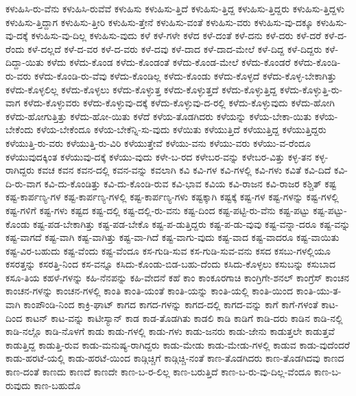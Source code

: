 {ಕಳುಹಿಸಿ-ರು-ವೆನು
ಕಳುಹಿಸಿ-ರುವೆವೆ
ಕಳುಹಿಸು
ಕಳುಹಿಸು-ತ್ತಿದೆ
ಕಳುಹಿಸು-ತ್ತಿದ್ದ
ಕಳುಹಿಸು-ತ್ತಿದ್ದರು
ಕಳುಹಿಸು-ತ್ತಿದ್ದಳು
ಕಳುಹಿಸು-ತ್ತಿದ್ದಾಗ
ಕಳುಹಿಸು-ತ್ತೀರಿ
ಕಳುಹಿಸು-ತ್ತೇನೆ
ಕಳುಹಿಸು-ವಂತೆ
ಕಳುಹಿಸು-ವರು
ಕಳುಹಿಸು-ವು-ದಕ್ಕೂ
ಕಳುಹಿಸು-ವು-ದಕ್ಕೆ
ಕಳುಹಿಸು-ವು-ದಿಲ್ಲ
ಕಳುಹಿಸು-ವುದು
ಕಳೆ
ಕಳೆ-ಗಳೇ
ಕಳೆದ
ಕಳೆ-ದಂತೆ
ಕಳೆ-ದನು
ಕಳೆ-ದರು
ಕಳೆ-ದರೆ
ಕಳೆ-ದ-ರೆಂದು
ಕಳೆ-ದಲ್ಲದೆ
ಕಳೆ-ದ-ವರ
ಕಳೆ-ದ-ವರು
ಕಳೆ-ದವು
ಕಳೆ-ದಾದ
ಕಳೆ-ದಾದ-ಮೇಲೆ
ಕಳೆ-ದಿದ್ದ
ಕಳೆ-ದಿದ್ದರು
ಕಳೆ-ದಿದ್ದಾ-ಯಿತು
ಕಳೆದು
ಕಳೆದು-ಕೊಂಡ
ಕಳೆದು-ಕೊಂಡಂತೆ
ಕಳೆದು-ಕೊಂಡ-ಮೇಲೆ
ಕಳೆದು-ಕೊಂಡರೆ
ಕಳೆದು-ಕೊಂಡಿ-ರು-ವರು
ಕಳೆದು-ಕೊಂಡಿ-ರು-ವೆವು
ಕಳೆದು-ಕೊಂಡಿಲ್ಲ
ಕಳೆದು-ಕೊಂಡು
ಕಳೆದು-ಕೊಳ್ಳದೆ
ಕಳೆದು-ಕೊಳ್ಳ-ಬೇಕಾಗಿತ್ತು
ಕಳೆದು-ಕೊಳ್ಳಲಿಲ್ಲ
ಕಳೆದು-ಕೊಳ್ಳಲು
ಕಳೆದು-ಕೊಳ್ಳುತ್ತ
ಕಳೆದು-ಕೊಳ್ಳುತ್ತದೆ
ಕಳೆದು-ಕೊಳ್ಳುತ್ತಿದ್ದ
ಕಳೆದು-ಕೊಳ್ಳುತ್ತಿ-ರು-ವಾಗ
ಕಳೆದು-ಕೊಳ್ಳುವರು
ಕಳೆದು-ಕೊಳ್ಳುವು-ದಕ್ಕೆ
ಕಳೆದು-ಕೊಳ್ಳುವು-ದ-ರಲ್ಲಿ
ಕಳೆದು-ಕೊಳ್ಳುವುದು
ಕಳೆದು-ಹೋಗಿ
ಕಳೆದು-ಹೋಗುತ್ತಿತ್ತು
ಕಳೆದು-ಹೋ-ಯಿತು
ಕಳೆದೆ
ಕಳೆಯ-ತೊಡಗಿದರು
ಕಳೆಯನ್ನು
ಕಳೆಯ-ಬೇಕಾ-ಯಿತು
ಕಳೆಯ-ಬೇಕೆಂದು
ಕಳೆಯ-ಬೇಕೆಂದೂ
ಕಳೆಯ-ಬೇಕೆನ್ನಿ-ಸು-ವುದು
ಕಳೆಯಿತು
ಕಳೆಯುತ್ತಿದೆ
ಕಳೆಯುತ್ತಿದ್ದ
ಕಳೆಯುತ್ತಿದ್ದರು
ಕಳೆಯುತ್ತಿ-ರು-ವರು
ಕಳೆಯುತ್ತಿ-ರು-ವಿರಿ
ಕಳೆಯುತ್ತೇವೆ
ಕಳೆಯು-ವನು
ಕಳೆಯು-ವರು
ಕಳೆಯು-ವ-ರೆಂದೂ
ಕಳೆಯುವುದಕ್ಕಿಂತ
ಕಳೆಯುವು-ದಕ್ಕೆ
ಕಳೆಯು-ವುದು
ಕಳೇ-ಬ-ರದ
ಕಳೇಬರ-ವನ್ನು
ಕಳೇಬರ-ವಿತ್ತು
ಕಳ್ಳ-ತನ
ಕಳ್ಳ-ರಾಗಿದ್ದರು
ಕವಚ
ಕವನ
ಕವನ-ದಲ್ಲಿ
ಕವನ-ವನ್ನು
ಕವಲಾಗಿ
ಕವಿ
ಕವಿ-ಗಳ
ಕವಿ-ಗಳಲ್ಲಿ
ಕವಿ-ಗಳು
ಕವಿತೆ
ಕವಿ-ದಿದೆ
ಕವಿ-ದಿ-ರು-ವಾಗ
ಕವಿ-ದು-ಕೊಂಡಿತ್ತು
ಕವಿ-ದು-ಕೊಂಡಿ-ರುವ
ಕವಿ-ಭಾವ
ಕವಿಯ
ಕವಿ-ರಾಜನ
ಕವಿ-ರಾಜರ
ಕಶ್ಚಿತ್
ಕಷ್ಟ
ಕಷ್ಟ-ಕಾರ್ಪಣ್ಯ-ಗಳ
ಕಷ್ಟ-ಕಾರ್ಪಣ್ಯ-ಗಳಲ್ಲಿ
ಕಷ್ಟ-ಕಾರ್ಪಣ್ಯ-ಗಳು
ಕಷ್ಟಕ್ಕಾಗಿ
ಕಷ್ಟಕ್ಕೆ
ಕಷ್ಟ-ಗಳ
ಕಷ್ಟ-ಗಳನ್ನು
ಕಷ್ಟ-ಗಳಲ್ಲಿ
ಕಷ್ಟ-ಗಳಿಗೆ
ಕಷ್ಟ-ಗಳು
ಕಷ್ಟದ
ಕಷ್ಟ-ದಲ್ಲಿ
ಕಷ್ಟ-ದಲ್ಲಿ-ರು-ವನು
ಕಷ್ಟ-ದಿಂದ
ಕಷ್ಟ-ಪಟ್ಟಿ-ರು-ವೆನು
ಕಷ್ಟ-ಪಟ್ಟು
ಕಷ್ಟ-ಪಟ್ಟು-ಕೊಂಡು
ಕಷ್ಟ-ಪಡ-ಬೇಕಾಗಿತ್ತು
ಕಷ್ಟ-ಪಡ-ಬೇಕೊ
ಕಷ್ಟ-ಪ-ಡುತ್ತಿದ್ದರು
ಕಷ್ಟ-ಪ-ಡು-ವುವು
ಕಷ್ಟ-ವನ್ನಾ-ದರೂ
ಕಷ್ಟ-ವನ್ನು
ಕಷ್ಟ-ವಾಗದೆ
ಕಷ್ಟ-ವಾಗಿ
ಕಷ್ಟ-ವಾಗಿತ್ತು
ಕಷ್ಟ-ವಾ-ಗಿದೆ
ಕಷ್ಟ-ವಾಗು-ವುದು
ಕಷ್ಟ-ವಾದ
ಕಷ್ಟ-ವಾದರೂ
ಕಷ್ಟ-ವಾಯಿತು
ಕಷ್ಟ-ವಿರ-ಬಹುದು
ಕಷ್ಟ-ವೆಂದು
ಕಷ್ಟ-ವೆಂದೂ
ಕಸ-ಗುಡಿ-ಸುವ
ಕಸ-ಗುಡಿ-ಸುವ-ವನು
ಕಸದ
ಕಸಬು-ಗಳಲ್ಲಿಯೂ
ಕಸರತ್ತನ್ನು
ಕಸರತ್ತಿ-ನಿಂದ
ಕಸ-ವನ್ನೂ
ಕಸಿದು-ಕೊಂಡು-ಬಿಡ-ಬಹು-ದೆಂದು
ಕಸಿದು-ಕೊಳ್ಳಲು
ಕಸುಬನ್ನು
ಕಸುಬಾದ
ಕಸೂ-ತಿಯ
ಕಹಳೆ-ಗಳನ್ನು
ಕಹಿ-ನೆನಪನ್ನು
ಕಹಿ-ವೇದನೆ
ಕಹೆ
ಕಾಂ
ಕಾಂಕೂರಗಾಚಿ
ಕಾಂಗ್ರಿಗೇ-ಶನಲ್
ಕಾಂಗ್ರೆಸ್
ಕಾಂಚನ
ಕಾಂಚನ-ಗಳನ್ನು
ಕಾಂಚನ-ಗಳಲ್ಲಿ
ಕಾಂತಿ
ಕಾಂತಿ-ಯಂತೆ
ಕಾಂತಿ-ಯನ್ನು
ಕಾಂತಿ-ಯಲ್ಲಿ
ಕಾಂತಿ-ಯಿಂದ
ಕಾಂತಿ-ಯು-ತ-ವಾಗಿ
ಕಾಂಪೌಂಡಿ-ನಿಂದ
ಕಾಕ್ರಿ-ಘಾಟ್
ಕಾಗದ
ಕಾಗದ-ಗಳನ್ನು
ಕಾಗದ-ದಲ್ಲಿ
ಕಾಗದ-ವನ್ನು
ಕಾಗೆ
ಕಾಗೆ-ಗಳಂತೆ
ಕಾಟ-ದಿಂದ
ಕಾಟನ್
ಕಾಟ-ವನ್ನು
ಕಾಟೀಸ್ಯಾನ್
ಕಾಡ
ಕಾಡ-ತೊಡಗಿತು
ಕಾಡಲಿ
ಕಾಡಿ
ಕಾಡಿಗೆ
ಕಾಡಿ-ದರು
ಕಾಡಿನ
ಕಾಡಿ-ನಲ್ಲಿ
ಕಾಡಿ-ನಲ್ಲೊ
ಕಾಡಿ-ನೊಳಗೆ
ಕಾಡು
ಕಾಡು-ಗಳಲ್ಲಿ
ಕಾಡು-ಗಳು
ಕಾಡು-ಜನರು
ಕಾಡು-ಜೇನು
ಕಾಡುತ್ತಲೇ
ಕಾಡುತ್ತವೆ
ಕಾಡುತ್ತಿದ್ದ
ಕಾಡುತ್ತಿ-ರುವ
ಕಾಡು-ಮನುಷ್ಯ-ರಾಗಿದ್ದರು
ಕಾಡು-ಮೇಡು
ಕಾಡು-ಮೇಡು-ಗಳಲ್ಲಿ
ಕಾಡುವ
ಕಾಡು-ವುದೆಂದರೆ
ಕಾಡು-ಹರಟೆ-ಯಲ್ಲಿ
ಕಾಡು-ಹರಟೆ-ಯಿಂದ
ಕಾಡ್ಗಿಚ್ಚಿಗೆ
ಕಾಡ್ಗಿಚ್ಚಿ-ನಂತೆ
ಕಾಣ-ತೊಡಗಿದರು
ಕಾಣ-ತೊಡಗಿದವು
ಕಾಣದ
ಕಾಣ-ದಂತೆ
ಕಾಣದು
ಕಾಣದೆ
ಕಾಣದೇ
ಕಾಣ-ಬ-ರ-ಲಿಲ್ಲ
ಕಾಣ-ಬರುತ್ತಿದೆ
ಕಾಣ-ಬ-ರು-ವು-ದಿಲ್ಲ-ವೆಂದೂ
ಕಾಣ-ಬ-ರುವುದು
ಕಾಣ-ಬಹುದೊ
}
